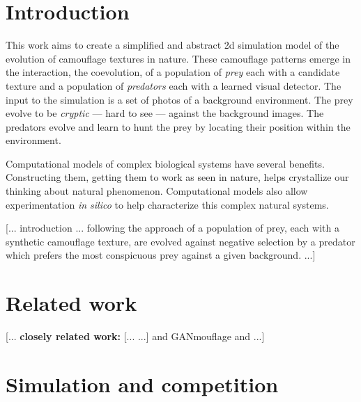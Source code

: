 \documentclass[sigconf]{acmart}
\begin{document}
\maketitle

\section{Introduction}
This work aims to create a simplified and abstract 2d simulation model of the evolution of camouflage textures in nature. These camouflage patterns emerge in the interaction, the coevolution, of a population of \textit{prey} each with a candidate texture and a population of \textit{predators} each with a learned visual detector. The input to the simulation is a set of photos of a background environment. The prey evolve to be \textit{cryptic} — hard to see — against the background images. The predators evolve and learn to hunt the prey by locating their position within the environment.

Computational models of complex biological systems have several benefits. Constructing them, getting them to work as seen in nature, helps crystallize our thinking about natural phenomenon. Computational models also allow experimentation \textit{in silico} to help characterize this complex natural systems.

[... introduction ... following the approach of \citet{Reynolds2011} a population of prey, each with a synthetic camouflage texture, are evolved against negative selection by a predator which prefers the most conspicuous prey against a given background. ...]


\section{Related work}
[... \textbf{closely related work:} 
[... \cite{harrington_coevolution_2014} ...]
and
GANmouflage \cite{guo_ganmouflage_2022} and \cite{owens_camouflaging_2014} ...] 
\par
[... TexSyn \textbf{[OK to mention name?]} is based on the “strongly typed” variant of Genetic Programming known as STGP \cite{montana_strongly_1995}, one of several grammar-based GP variants \cite{Mckay_2010}. ...]


\section{Simulation and competition}
\end{document}
